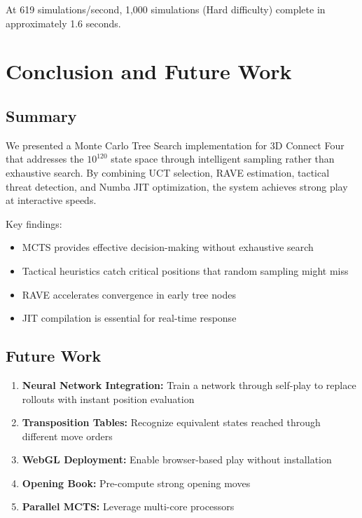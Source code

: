 \documentclass[11pt]{article}
\begin{document}

At 619 simulations/second, 1,000 simulations (Hard difficulty) complete in approximately 1.6 seconds.

\section{Conclusion and Future Work}

\subsection{Summary}

We presented a Monte Carlo Tree Search implementation for 3D Connect Four that addresses the $10^{120}$ state space through intelligent sampling rather than exhaustive search. By combining UCT selection, RAVE estimation, tactical threat detection, and Numba JIT optimization, the system achieves strong play at interactive speeds.

Key findings:
\begin{itemize}
    \item MCTS provides effective decision-making without exhaustive search
    \item Tactical heuristics catch critical positions that random sampling might miss
    \item RAVE accelerates convergence in early tree nodes
    \item JIT compilation is essential for real-time response
\end{itemize}

\subsection{Future Work}

\begin{enumerate}
    \item \textbf{Neural Network Integration:} Train a network through self-play to replace rollouts with instant position evaluation
    \item \textbf{Transposition Tables:} Recognize equivalent states reached through different move orders
    \item \textbf{WebGL Deployment:} Enable browser-based play without installation
    \item \textbf{Opening Book:} Pre-compute strong opening moves
    \item \textbf{Parallel MCTS:} Leverage multi-core processors
\end{enumerate}
\end{document}
